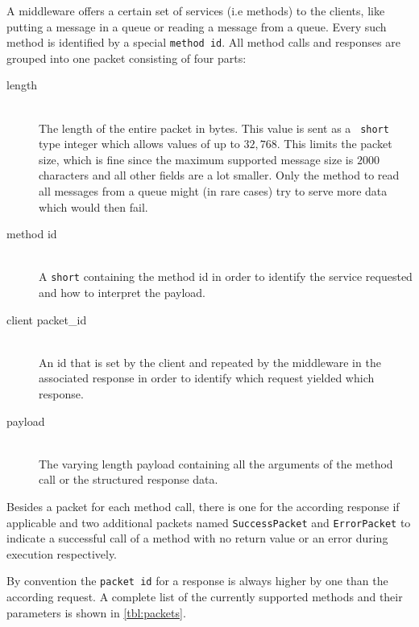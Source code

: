 \documentclass[a4paper, oneside]{csthesis}
\begin{document}
    A middleware offers a certain set of services (i.e methods) to the clients,
    like putting a message in a queue or reading a message from a queue. Every
    such method is identified by a special {\tt method id}. All method calls and
    responses are grouped into one \telesto{} packet consisting of four parts:
    \begin{description}
    \item[length] \ \\
        The length of the entire packet in bytes. This value is sent as a {\tt
        short} type integer which allows values of up to $32,768$. This limits
        the packet size, which is fine since the maximum supported message size
        is $2000$ characters and all other fields are a lot smaller. Only the
        method to read all messages from a queue might (in rare cases) try to
        serve more data which would then fail.
    \item[method id] \ \\
        A {\tt short} containing the method id in order to identify the service
        requested and how to interpret the payload.
    \item[client packet\_id] \ \\
        An id that is set by the client and repeated by the middleware in the
        associated response in order to identify which request yielded which response.
    \item[payload] \ \\
        The varying length payload containing all the arguments of the method
        call or the structured response data.
    \end{description}
    
    Besides a packet for each method call, there is one for the according
    response if applicable and two additional packets named {\tt SuccessPacket}
    and {\tt ErrorPacket} to indicate a successful call of a method with no
    return value or an error during execution respectively.
    
    By convention the {\tt packet id} for a response is always higher by one
    than the according request. A complete list of the currently supported methods and
    their parameters is shown in \cref{tbl:packets}.
    
\end{document}
